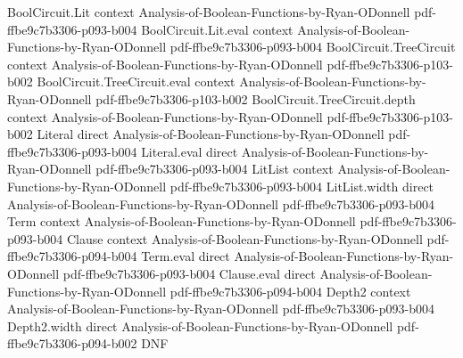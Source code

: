 \begin{lemma}
\label{LMN.absorbOneLevel_depth1}
\leanok
{}
\proofstep
  {BoolCircuit.Lit}
  {context}
  {Analysis-of-Boolean-Functions-by-Ryan-ODonnell}
  {pdf-ffbe9c7b3306-p093-b004}
\proofstep
  {BoolCircuit.Lit.eval}
  {context}
  {Analysis-of-Boolean-Functions-by-Ryan-ODonnell}
  {pdf-ffbe9c7b3306-p093-b004}
\proofstep
  {BoolCircuit.TreeCircuit}
  {context}
  {Analysis-of-Boolean-Functions-by-Ryan-ODonnell}
  {pdf-ffbe9c7b3306-p103-b002}
\proofstep
  {BoolCircuit.TreeCircuit.eval}
  {context}
  {Analysis-of-Boolean-Functions-by-Ryan-ODonnell}
  {pdf-ffbe9c7b3306-p103-b002}
\proofstep
  {BoolCircuit.TreeCircuit.depth}
  {context}
  {Analysis-of-Boolean-Functions-by-Ryan-ODonnell}
  {pdf-ffbe9c7b3306-p103-b002}
\proofstep
  {Literal}
  {direct}
  {Analysis-of-Boolean-Functions-by-Ryan-ODonnell}
  {pdf-ffbe9c7b3306-p093-b004}
\proofstep
  {Literal.eval}
  {direct}
  {Analysis-of-Boolean-Functions-by-Ryan-ODonnell}
  {pdf-ffbe9c7b3306-p093-b004}
\proofstep
  {LitList}
  {context}
  {Analysis-of-Boolean-Functions-by-Ryan-ODonnell}
  {pdf-ffbe9c7b3306-p093-b004}
\proofstep
  {LitList.width}
  {direct}
  {Analysis-of-Boolean-Functions-by-Ryan-ODonnell}
  {pdf-ffbe9c7b3306-p093-b004}
\proofstep
  {Term}
  {context}
  {Analysis-of-Boolean-Functions-by-Ryan-ODonnell}
  {pdf-ffbe9c7b3306-p093-b004}
\proofstep
  {Clause}
  {context}
  {Analysis-of-Boolean-Functions-by-Ryan-ODonnell}
  {pdf-ffbe9c7b3306-p094-b004}
\proofstep
  {Term.eval}
  {direct}
  {Analysis-of-Boolean-Functions-by-Ryan-ODonnell}
  {pdf-ffbe9c7b3306-p093-b004}
\proofstep
  {Clause.eval}
  {direct}
  {Analysis-of-Boolean-Functions-by-Ryan-ODonnell}
  {pdf-ffbe9c7b3306-p094-b004}
\proofstep
  {Depth2}
  {context}
  {Analysis-of-Boolean-Functions-by-Ryan-ODonnell}
  {pdf-ffbe9c7b3306-p093-b004}
\proofstep
  {Depth2.width}
  {direct}
  {Analysis-of-Boolean-Functions-by-Ryan-ODonnell}
  {pdf-ffbe9c7b3306-p094-b002}
\proofstep
  {DNF}

\end{lemma}
